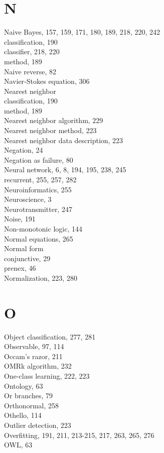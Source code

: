 \documentclass[10pt]{article}
\begin{document}
\section*{N}
Naive Bayes, 157, 159, 171, 180, 189, 218, 220, 242\\
classification, 190\\
classifier, 218, 220\\
method, 189\\
Naive reverse, 82\\
Navier-Stokes equation, 306\\
Nearest neighbor\\
classification, 190\\
method, 189\\
Nearest neighbor algorithm, 229\\
Nearest neighbor method, 223\\
Nearest neighbor data description, 223\\
Negation, 24\\
Negation as failure, 80\\
Neural network, 6, 8, 194, 195, 238, 245\\
recurrent, 255, 257, 282\\
Neuroinformatics, 255\\
Neuroscience, 3\\
Neurotransmitter, 247\\
Noise, 191\\
Non-monotonic logic, 144\\
Normal equations, 265\\
Normal form\\
conjunctive, 29\\
prenex, 46\\
Normalization, 223, 280

\section*{O}
Object classification, 277, 281\\
Observable, 97, 114\\
Occam's razor, 211\\
OMRk algorithm, 232\\
One-class learning, 222, 223\\
Ontology, 63\\
Or branches, 79\\
Orthonormal, 258\\
Othello, 114\\
Outlier detection, 223\\
Overfitting, 191, 211, 213-215, 217, 263, 265, 276\\
OWL, 63
\end{document}

